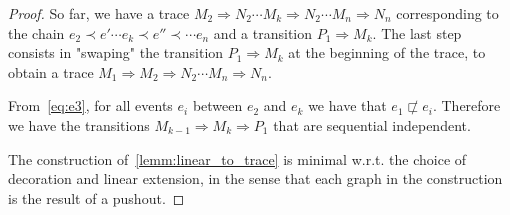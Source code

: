 \begin{proof}
  So far, we have a trace $M_2\Rightarrow N_2\cdots M_k\Rightarrow N_2\cdots M_n\Rightarrow N_n$ corresponding to the chain $e_2\prec e'\cdots e_k\prec e''\prec\cdots e_n$ and a transition $P_1\Rightarrow M_k$. The last step consists in "swaping" the transition $P_1\Rightarrow M_k$ at the beginning of the trace, to obtain a trace $M_1\Rightarrow M_2\Rightarrow N_2\cdots M_n\Rightarrow N_n$.

  From~\autoref{eq:e3}, for all events $e_i$ between $e_2$ and $e_k$ we have that $e_1\not\sqsubset e_i$.
  Therefore we have the transitions $M_{k-1}\Rightarrow M_k\Rightarrow P_1$ that are sequential independent.


  The construction of~\autoref{lemm:linear_to_trace} is minimal w.r.t. the choice of decoration and linear extension, in the sense that each graph in the construction is the result of a pushout.



\end{proof}




\newpage

